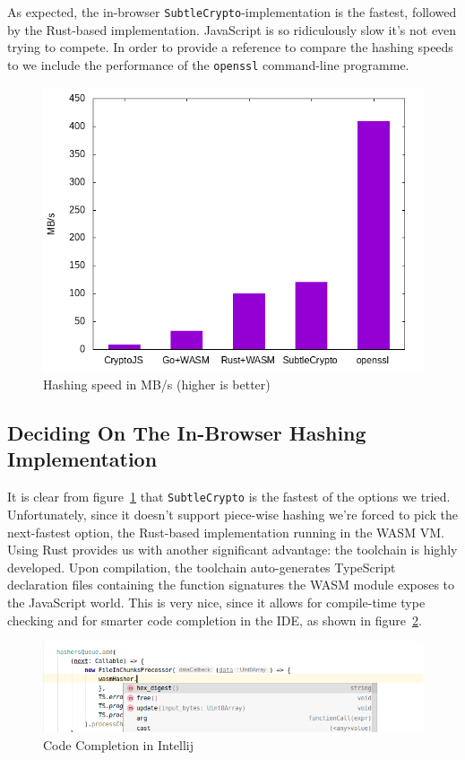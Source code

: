 As expected, the in-browser \texttt{SubtleCrypto}-implementation is the fastest, followed by the Rust-based implementation.
JavaScript is so ridiculously slow it's not even trying to compete.
In order to provide a reference to compare the hashing speeds to we include the performance of the \texttt{openssl} command-line programme.

\begin{figure}
    \begin{center}
        \includegraphics[width=0.7\linewidth]{images/hashingperformance.png}
        \caption{Hashing speed in MB/s (higher is better)}
        \label{fig:hashingperformance}
    \end{center}
\end{figure}


\subsection{Deciding On The In-Browser Hashing Implementation}
\label{subsec:deciding-on-the-in-browser-hashing-implementation}
It is clear from figure~\ref{fig:hashingperformance} that \texttt{SubtleCrypto} is the fastest of the options we tried.
Unfortunately, since it doesn't support piece-wise hashing we're forced to pick the next-fastest option,
the Rust-based implementation running in the \gls{WASM} \gls{VM}.
Using Rust provides us with another significant advantage:
the toolchain is highly developed.
Upon compilation, the toolchain auto-generates TypeScript declaration files containing the function signatures
the \gls{WASM} module exposes to the JavaScript world.
This is very nice, since it allows for compile-time type checking and for smarter code completion in the \gls{IDE},
as shown in figure~\ref{fig:dtside}.

\begin{figure}
    \begin{center}
        \includegraphics[width=0.7\linewidth]{images/dtside.png}
        \caption{Code Completion in Intellij}
        \label{fig:dtside}
    \end{center}
\end{figure}


